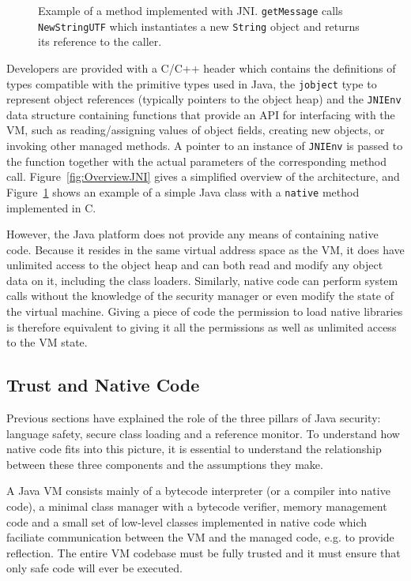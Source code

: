 \documentclass[a4paper,12pt,twoside,openright]{report}
\begin{document}
\begin{figure}[t]
	
	
	\caption{Example of a method implemented with JNI. \texttt{getMessage} calls \texttt{NewStringUTF} which instantiates a new \texttt{String} object and returns its reference to the caller.}
	\label{listing:HelloJNI}
\end{figure}

Developers are provided with a C/C++ header which contains the definitions of types compatible with the primitive types used in Java, the \texttt{jobject} type to represent object references (typically pointers to the object heap) and the \texttt{JNIEnv} data structure containing functions that provide an API for interfacing with the VM, such as reading/assigning values of object fields, creating new objects, or invoking other managed methods. A pointer to an instance of \texttt{JNIEnv} is passed to the function together with the actual parameters of the corresponding method call. Figure~\ref{fig:OverviewJNI} gives a simplified overview of the architecture, and Figure~\ref{listing:HelloJNI} shows an example of a simple Java class with a \texttt{native} method implemented in C.

However, the Java platform does not provide any means of containing native code. Because it resides in the same virtual address space as the VM, it does have unlimited access to the object heap and can both read and modify any object data on it, including the class loaders. Similarly, native code can perform system calls without the knowledge of the security manager or even modify the state of the virtual machine. Giving a piece of code the permission to load native libraries is therefore equivalent to giving it all the permissions as well as unlimited access to the VM state.

\subsection{Trust and Native Code}

Previous sections have explained the role of the three pillars of Java security: language safety, secure class loading and a reference monitor. To understand how native code fits into this picture, it is essential to understand the relationship between these three components and the assumptions they make.

A Java VM consists mainly of a bytecode interpreter (or a compiler into native code), a minimal class manager with a bytecode verifier, memory management code and a small set of low-level classes implemented in native code which faciliate communication between the VM and the managed code, e.g. to provide reflection. The entire VM codebase must be fully trusted and it must ensure that only safe code will ever be executed.
\end{document}
